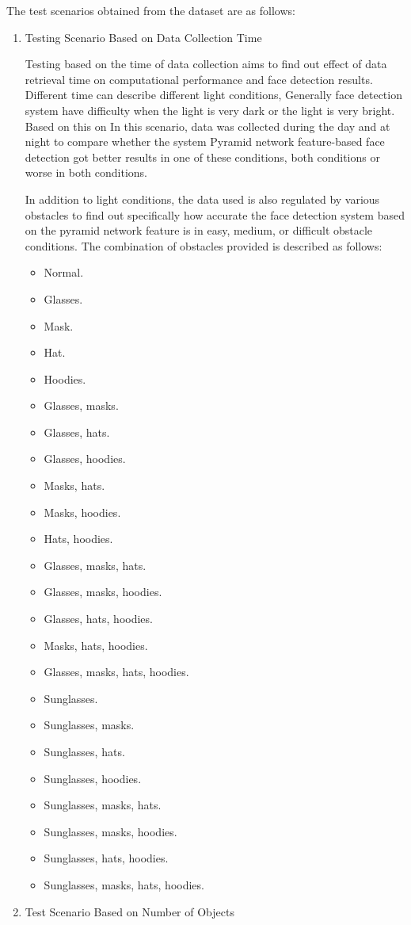 The test scenarios obtained from the dataset are as follows:
\begin{enumerate}
  \item Testing Scenario Based on Data Collection Time

  Testing based on the time of data collection aims to find out
  effect of data retrieval time on computational performance and face detection results.
  Different time can describe different light conditions, Generally face detection system
  have difficulty when the light is very dark or the light is very bright. Based on this on
  In this scenario, data was collected during the day and at night to compare whether the system
  Pyramid network feature-based face detection got better results in one of these conditions, both
  conditions or worse in both conditions.

  In addition to light conditions, the data used is also regulated by various obstacles
  to find out specifically how accurate the face detection system based on the pyramid network feature is in easy, medium, or difficult obstacle conditions.
  The combination of obstacles provided is described as follows:
  \begin{itemize}
    \item Normal.
    \item Glasses.
    \item Mask.
    \item Hat.
    \item Hoodies.
    \item Glasses, masks.
    \item Glasses, hats.
    \item Glasses, hoodies.
    \item Masks, hats.
    \item Masks, hoodies.
    \item Hats, hoodies.
    \item Glasses, masks, hats.
    \item Glasses, masks, hoodies.
    \item Glasses, hats, hoodies.
    \item Masks, hats, hoodies.
    \item Glasses, masks, hats, hoodies.
    \item Sunglasses.
    \item Sunglasses, masks.
    \item Sunglasses, hats.
    \item Sunglasses, hoodies.
    \item Sunglasses, masks, hats.
    \item Sunglasses, masks, hoodies.
    \item Sunglasses, hats, hoodies.
    \item Sunglasses, masks, hats, hoodies.
  \end{itemize}
  \item Test Scenario Based on Number of Objects
  

\end{enumerate}
